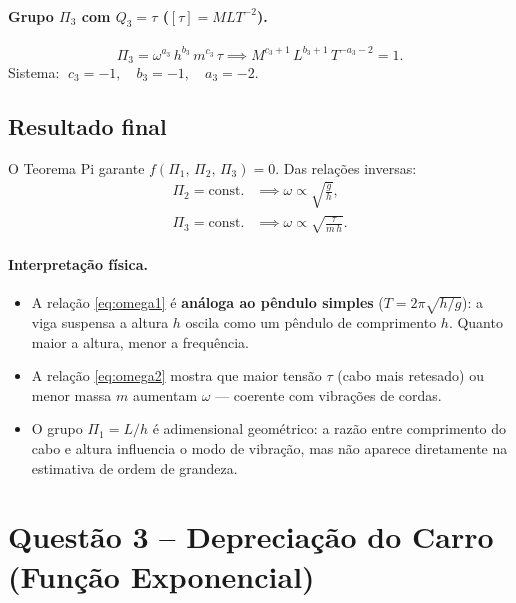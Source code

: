 \documentclass[12pt,a4paper]{article}
\theoremstyle{definition}
\newcommand{\resultado}[1]{%
  \begin{center}
    \fbox{\parbox{0.85\linewidth}{\centering $\displaystyle #1$}}
  \end{center}
}
\begin{document}
\paragraph{Grupo $\Pi_3$ com $Q_3 = \tau$ ($[\tau]=MLT^{-2}$).}
\begin{equation}
  \Pi_3 = \omega^{a_3}\,h^{b_3}\,m^{c_3}\,\tau
  \implies M^{c_3+1}\,L^{b_3+1}\,T^{-a_3-2} = 1.
\end{equation}
Sistema:
$\;c_3 = -1,\quad b_3 = -1,\quad a_3 = -2.$
\resultado{\Pi_3 = \frac{\tau}{m\,h\,\omega^2}}

\subsection{Resultado final}

O Teorema Pi garante $f(\Pi_1,\,\Pi_2,\,\Pi_3) = 0$.
Das rela\c{c}\~oes inversas:
\begin{align}
  \Pi_2 = \text{const.}
  &\implies \boxed{\omega \propto \sqrt{\frac{g}{h}}},
  \label{eq:omega1}\\[6pt]
  \Pi_3 = \text{const.}
  &\implies \boxed{\omega \propto \sqrt{\frac{\tau}{m\,h}}}.
  \label{eq:omega2}
\end{align}

\paragraph{Interpreta\c{c}\~ao f\'isica.}
\begin{itemize}
  \item A rela\c{c}\~ao \eqref{eq:omega1} \'e \textbf{an\'aloga ao p\^endulo simples}
    ($T = 2\pi\sqrt{h/g}$): a viga suspensa a altura $h$ oscila como um p\^endulo
    de comprimento $h$. Quanto maior a altura, menor a frequ\^encia.
  \item A rela\c{c}\~ao \eqref{eq:omega2} mostra que maior tens\~ao $\tau$
    (cabo mais retesado) ou menor massa $m$ aumentam $\omega$ --- coerente com
    vibrações de cordas.
  \item O grupo $\Pi_1 = L/h$ \'e adimensional geom\'etrico: a raz\~ao entre
    comprimento do cabo e altura influencia o modo de vibra\c{c}\~ao,
    mas n\~ao aparece diretamente na estimativa de ordem de grandeza.
\end{itemize}

\section{Quest\~ao 3 -- Deprecia\c{c}\~ao do Carro (Fun\c{c}\~ao Exponencial)}
\end{document}
